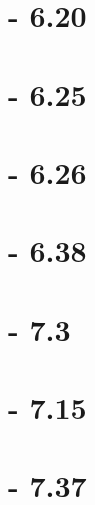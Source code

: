 \documentclass[12pt]{article}
\begin{document}
\section{- 6.20}


\section{- 6.25}


\section{- 6.26}


\section{- 6.38}


\section{- 7.3}


\section{- 7.15}


\section{- 7.37}



\end{document}
